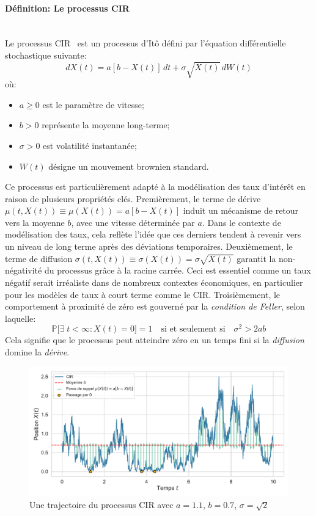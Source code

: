 \paragraph{Définition: Le processus \acl{CIR}}\mbox{}\\
Le processus \ac{CIR}~\cite{cox1985} est un processus d'Itô défini par l'équation différentielle stochastique suivante:
\begin{equation}
    dX(t) = a[b - X(t)]\,dt + \sigma \sqrt{X(t)}\,dW(t)
\end{equation}\label{cir_eq}
où:
\begin{itemize}
    \item $a \geq 0$ est le paramètre de vitesse;
    \item $b > 0$ représente la moyenne long-terme;
    \item $\sigma > 0$ est volatilité instantanée;
    \item $W(t)$ désigne un mouvement brownien standard.
\end{itemize}
Ce processus est particulièrement adapté à la modélisation des taux d'intérêt en raison de plusieurs propriétés clés. Premièrement, le terme de dérive \(\mu(t, X(t)) \equiv \mu(X(t))= a[b - X(t)]\) induit un mécanisme de retour vers la moyenne $b$, avec une vitesse déterminée par $a$. Dans le contexte de modélisation des taux, cela reflète l'idée que ces derniers tendent à revenir vers un niveau de long terme après des déviations temporaires. Deuxièmement, le terme de diffusion \(\sigma(t, X(t))\equiv \sigma(X(t)) = \sigma \sqrt{X(t)}\) garantit la non-négativité du processus grâce à la racine carrée. Ceci est essentiel comme un taux négatif serait irréaliste dans de nombreux contextes économiques, en particulier pour les modèles de taux à court terme comme le \acs{CIR}. Troisièmement, le comportement à proximité de zéro est gouverné par la \textit{condition de Feller}, selon laquelle:
\[
\mathds{P} \Big[ \exists\;t < \infty:X(t) = 0 \Big] = 1 \quad \text{si et seulement si} \quad \sigma^2 > 2ab
\]
Cela signifie que le processus peut atteindre zéro en un temps fini si la \textit{diffusion} domine la \textit{dérive}.
\begin{figure}[htb]
    \centering
    \includegraphics[width=0.9\linewidth]{img/intro/path_cir_combined.pdf}
    \caption{Une trajectoire du processus \acs{CIR} avec $a=1.1$, $b=0.7$, $\sigma=\sqrt{2}$}\label{fig:TrajCIR}
\end{figure}
